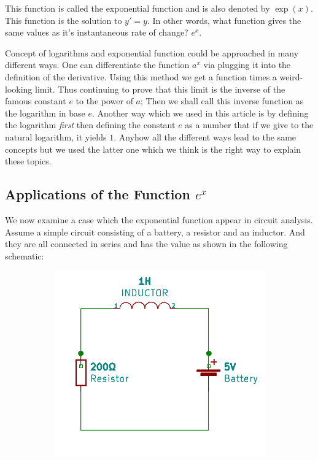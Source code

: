 \documentclass{article}
\begin{document}
	This function is called the exponential function and is also denoted by \boldmath$\exp(x)$. This function is the solution to \textit{$y' = y$}. In other words, what function gives the same values as it's instantaneous rate of change? $e^x$.
	
	Concept of logarithms and exponential function could be approached in many different ways. One can differentiate the function $a^x$ via plugging it into the definition of the derivative. Using this method we get a function times a weird-looking limit. Thus continuing to prove that this limit is the inverse of the famous constant $e$ to the power of $a$; Then we shall call this inverse function as the logarithm in base $e$. Another way which we used in this article is by defining the logarithm \textit{first} then defining the constant $e$ as a number that if we give to the natural logarithm, it yields $1$. Anyhow all the different ways lead to the same concepts but we used the latter one which we think is the right way to explain these topics.
	
	\subsection{Applications of the Function $e^x$}
	We now examine a case which the exponential function appear in circuit analysis. Assume a simple circuit consisting of a battery, a resistor and an inductor. And they are all connected in series and has the value as shown in the following schematic:
	\begin{figure}[h!]
 	\centering
	\begin{subfigure}[b]{0.6\linewidth}
		\includegraphics[width=\linewidth]{circuit1.png}
	\end{subfigure}
	\end{figure}
	
\end{document}
